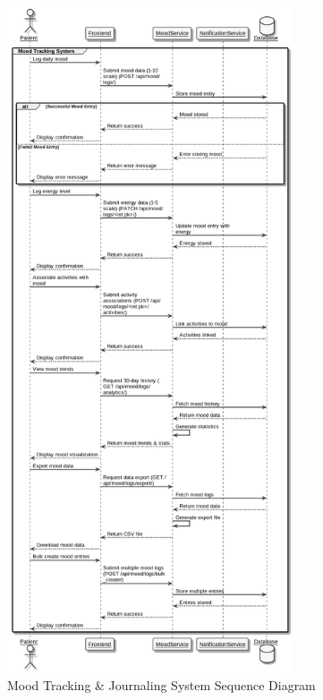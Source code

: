 \begin{figure}[H]
    \centering
    \includegraphics[width=0.75\textwidth]{Mood_Sequence_Diagram.png}
    \caption{Mood Tracking \& Journaling System Sequence Diagram}
    \label{fig:mood-sequence-diagram}
\end{figure}

